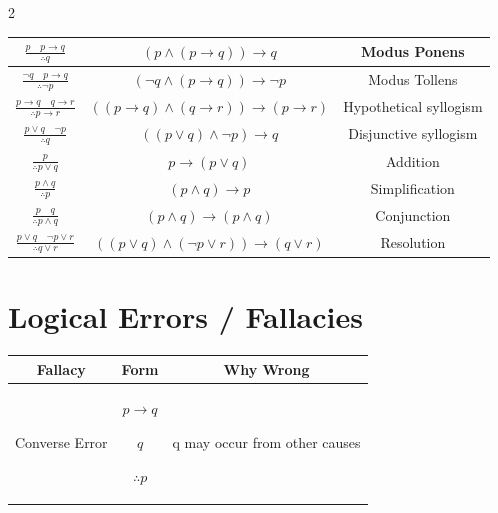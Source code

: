 \documentclass[9pt]{article}
\begin{document}
\begin{multicols}{2}
\begin{tabular}{|c|c|c|}
$\frac{p \quad p\rightarrow q}{\therefore q}$ &
$(p\land(p\rightarrow q))\rightarrow q$
& Modus Ponens \\

\hline

$\frac{\neg q \quad p\rightarrow q}{\therefore \neg p}$ &
$(\neg q\land(p\rightarrow q))\rightarrow \neg p$
& Modus Tollens \\

\hline

$\frac{p\rightarrow q \quad q\rightarrow r}{\therefore p\rightarrow r}$ &
$((p\rightarrow q)\land(q\rightarrow r))\rightarrow(p\rightarrow r)$
& Hypothetical syllogism \\

\hline

$\frac{p\lor q \quad \neg p}{\therefore q}$ &
$((p\lor q)\land \neg p)\rightarrow q$
& Disjunctive syllogism \\

\hline

$\frac{p}{\therefore p\lor q}$ &
$p\rightarrow(p\lor q)$
& Addition \\

\hline

$\frac{p\land q}{\therefore p}$ &
$(p\land q)\rightarrow p$
& Simplification \\

\hline

$\frac{p \quad q}{\therefore p\land q}$ &
$(p\land q)\rightarrow(p\land q)$
& Conjunction \\

\hline

$\frac{p\lor q \quad \neg p\lor r}{\therefore q\lor r}$ &
$((p\lor q)\land(\neg p\lor r))\rightarrow(q\lor r)$
& Resolution \\

\hline
\end{tabular}

\section*{Logical Errors / Fallacies}

\begin{tabular}{|c|c|c|}
\hline
Fallacy & Form & Why Wrong \\
\hline

Converse Error &
$p\rightarrow q$

$q$

$\therefore p$
&
q may occur from other causes
\\


\end{tabular}
\end{multicols}
\end{document}
